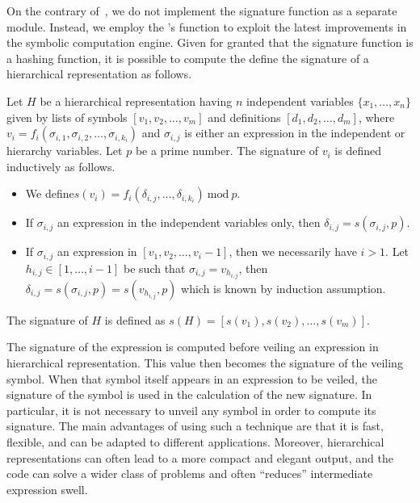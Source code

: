 On the contrary of~\cite{carette2006linear, zhou2007symbolic}, we do not implement the signature function as a separate module. Instead, we employ the \Maple{}'s  function to exploit the latest improvements in the symbolic computation engine. Given for granted that the signature function is a hashing function, it is possible to compute the define the signature of a hierarchical representation as follows.

\begin{definition}
  Let $H$ be a hierarchical representation having $n$ independent variables $\{x_1, \dots, x_n\}$ given by lists of symbols $[v_1, v_2, \dots, v_m]$ and definitions $[d_1, d_2, \dots, d_m]$, where $v_i = f_i(\sigma_{i,1}, \sigma_{i,2}, \dots, \sigma_{i,k_i})$ and $\sigma_{i,j}$ is either an expression in the independent or hierarchy variables. Let $p$ be a prime number. The signature of $v_i$ is defined inductively as follows.
  \begin{itemize}
    \setlength\itemsep{0em}
    \item We define$ s(v_i) = f_i(\delta_{i,j}, \dots, \delta_{i,k_i}) ~ \mathrm{mod} ~ p$.
    \item If $\sigma_{i,j}$ an expression in the independent variables only, then $\delta_{i,j} = s(\sigma_{i,j}, p)$.
    \item If $\sigma_{i,j}$ an expression in $[v_1, v_2, \dots, v_i-1]$, then we necessarily have $i > 1$. Let $h_{i,j} \in [1, \dots, i-1]$ be such that $\sigma_{i,j} = v_{h_{i,j}}$, then $\delta_{i,j} = s(\sigma_{i,j}, p) = s(v_{h_{i,j}}, p)$ which is known by induction assumption.
  \end{itemize}
  The signature of $H$ is defined as $s(H) = [s(v_1), s(v_2), \dots, s(v_m)]$.
\end{definition}

The signature of the expression is computed before veiling an expression in hierarchical representation. This value then becomes the signature of the veiling symbol. When that symbol itself appears in an expression to be veiled, the signature of the symbol is used in the calculation of the new signature. In particular, it is not necessary to unveil any symbol in order to compute its signature. The main advantages of using such a technique are that it is fast, flexible, and can be adapted to different applications. Moreover, hierarchical representations can often lead to a more compact and elegant output, and the code can solve a wider class of problems and often ``reduces'' intermediate expression swell.

